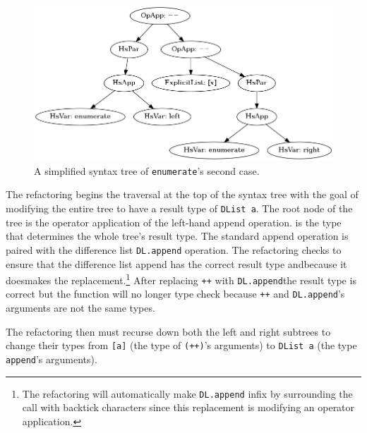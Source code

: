 \begin{figure}[h]
	\begin{center}
		\includegraphics[scale=.5]{graphVis/Chapter3/enumerate.png}
	\end{center}
	\caption{A simplified syntax tree of \texttt{enumerate}'s second case.}
	\label{enumAST}
\end{figure}

The refactoring begins the traversal at the top of the syntax tree with the goal of modifying the entire tree to have a result type of \texttt{DList a}. The root node of the tree is the operator application of the left-hand append operation. \DIFdelbegin {}\DIFdelend \DIFaddbegin {}\DIFaddend is the type that determines the whole tree's result type. The standard append operation is paired with the difference list \texttt{DL.append} operation. The refactoring checks to ensure that the difference list append has the correct result type and\DIFaddbegin \DIFadd{, }\DIFaddend because it does\DIFaddbegin \DIFadd{, }\DIFaddend makes the replacement.\footnote{The refactoring will automatically make \texttt{DL.append} infix by surrounding the call with backtick characters since this replacement is modifying an operator application.} After replacing \texttt{++} with \texttt{DL.append}\DIFaddbegin \DIFadd{, }\DIFaddend the result type is correct but the function will no longer type check because \texttt{++} and \texttt{DL.append}'s arguments are not the same types. 

The refactoring then must recurse down both the left and right subtrees to change their types from \texttt{[a]} (the type of \texttt{(++)}'s arguments) to \texttt{DList a} (the type \texttt{append}'s arguments). 

